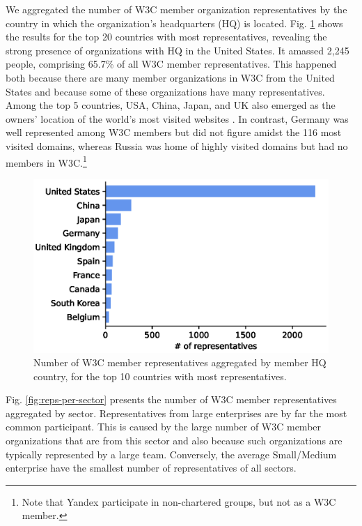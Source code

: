 \documentclass[sigconf, nonacm]{acmart}              %
\begin{document}
We aggregated the number of W3C member organization representatives by the country in which the organization's headquarters (HQ) is located. Fig. \ref{fig:reps-per-country} shows the results for the top 20 countries with most representatives, revealing the strong presence of organizations with HQ in the United States. It amassed 2,245 people, comprising 65.7\% of all W3C member representatives. This happened both because there are many member organizations in W3C from the United States and because some of these organizations have many representatives. Among the top 5 countries, USA, China, Japan, and UK also emerged as the owners' location of the world's most visited websites \cite{Xavier2024}. In contrast, Germany was well represented among W3C members but did not figure amidst the 116 most visited domains, whereas Russia was home of highly visited domains but had no members in W3C.\footnote{Note that Yandex participate in non-chartered groups, but not as a W3C member.} 

\begin{figure}[ht]
  \centering
  \includegraphics[width=1.0\columnwidth]{images/n-reps-per-country.eps}
  \caption{Number of W3C member representatives aggregated by member HQ country, for the top 10 countries with most representatives.}
  \label{fig:reps-per-country}
\end{figure}

Fig. \ref{fig:reps-per-sector} presents the number of W3C member representatives aggregated by sector. Representatives from large enterprises are by far the most common participant. This is caused by the large number of W3C member organizations that are from this sector and also because such organizations are typically represented by a large team. Conversely, the average Small/Medium enterprise have the smallest number of representatives of all sectors.
\end{document}
